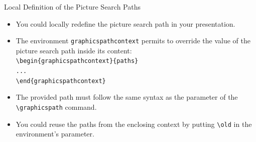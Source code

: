 \documentclass[english,sectioncirclenumberstyle]{ciadbeamer}
\begin{document}
\begin{frame}{Local Definition of the Picture Search Paths}
	\begin{itemize}
	\item You could locally redefine the picture search path in your presentation.
	\item The environment \texttt{graphicspathcontext} permits to override the value of the picture search path inside its content: \\
			\texttt{{\textbackslash}begin\{graphicspathcontext\}\{paths\}} \\
			\texttt{...} \\
			\texttt{{\textbackslash}end\{graphicspathcontext\}}
	\item The provided path must follow the same syntax as the parameter of the \texttt{{\textbackslash}graphicspath} command.
	\item You could reuse the paths from the enclosing context by putting \texttt{{\textbackslash}old} in the environment's parameter. \\
	\end{itemize}
\end{frame}
\end{document}
